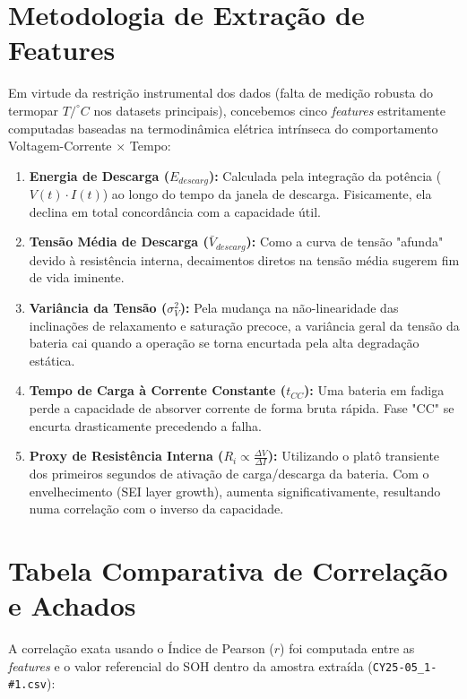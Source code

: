 \documentclass[a4paper,12pt]{article}
\begin{document}
\section{Metodologia de Extração de Features}
Em virtude da restrição instrumental dos dados (falta de medição robusta do termopar $T/^\circ C$ nos datasets principais), concebemos cinco \textit{features} estritamente computadas baseadas na termodinâmica elétrica intrínseca do comportamento Voltagem-Corrente $\times$ Tempo: 

\begin{enumerate}
    \item \textbf{Energia de Descarga ($E_{descarg}$):} Calculada pela integração da potência ($V(t) \cdot I(t)$) ao longo do tempo da janela de descarga. Fisicamente, ela declina em total concordância com a capacidade útil.
    \item \textbf{Tensão Média de Descarga ($\bar{V}_{descarg}$):} Como a curva de tensão "afunda" devido à resistência interna, decaimentos diretos na tensão média sugerem fim de vida iminente.
    \item \textbf{Variância da Tensão ($\sigma^2_{V}$):} Pela mudança na não-linearidade das inclinações de relaxamento e saturação precoce, a variância geral da tensão da bateria cai quando a operação se torna encurtada pela alta degradação estática.
    \item \textbf{Tempo de Carga à Corrente Constante ($t_{CC}$):} Uma bateria em fadiga perde a capacidade de absorver corrente de forma bruta rápida. Fase "CC" se encurta drasticamente precedendo a falha.
    \item \textbf{Proxy de Resistência Interna ($R_i \propto \frac{\Delta V}{\Delta I}$):} Utilizando o platô transiente dos primeiros segundos de ativação de carga/descarga da bateria. Com o envelhecimento (SEI layer growth), aumenta significativamente, resultando numa correlação com o inverso da capacidade.
\end{enumerate}

\section{Tabela Comparativa de Correlação e Achados}
A correlação exata usando o Índice de Pearson ($r$) foi computada entre as \textit{features} e o valor referencial do SOH dentro da amostra extraída (\texttt{CY25-05\_1-\#1.csv}):
\end{document}
